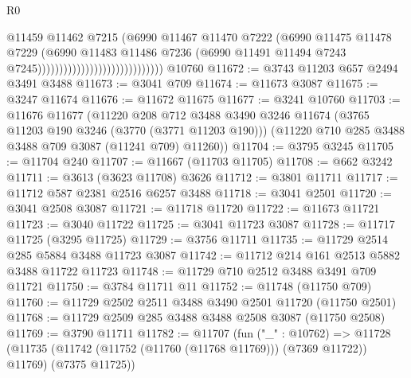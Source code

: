 \begin{lexlean}{R0}
\begin{coremodule}
                                                      @11459
                                                      @11462
                                                      @7215
                                                      (@6990
                                                        @11467
                                                        @11470
                                                        @7222
                                                        (@6990
                                                          @11475
                                                          @11478
                                                          @7229
                                                          (@6990
                                                            @11483
                                                            @11486
                                                            @7236
                                                            (@6990
                                                              @11491
                                                              @11494
                                                              @7243
                                                              @7245)))))))))))))))))))))))))))))
    @10760
@11672 := @3743 @11203 @657 @2494 @3491 @3488
@11673 := @3041 @709
@11674 := @11673 @3087
@11675 := @3247 @11674
@11676 := @11672 @11675
@11677 := @3241 @10760
@11703 := @11676
    @11677
    (@11220
      @208
      @712
      @3488
      @3490
      @3246
      @11674
      (@3765 @11203 @190 @3246 (@3770 (@3771 @11203 @190)))
      (@11220 @710 @285 @3488 @3488 @709 @3087 (@11241 @709) @11260))
@11704 := @3795 @3245
@11705 := @11704 @240
@11707 := @11667 (@11703 @11705)
@11708 := @662 @3242
@11711 := @3613 (@3623 @11708) @3626
@11712 := @3801 @11711
@11717 := @11712 @587 @2381 @2516 @6257 @3488
@11718 := @3041 @2501
@11720 := @3041 @2508 @3087
@11721 := @11718 @11720
@11722 := @11673 @11721
@11723 := @3040 @11722
@11725 := @3041 @11723 @3087
@11728 := @11717 @11725 (@3295 @11725)
@11729 := @3756 @11711
@11735 := @11729 @2514 @285 @5884 @3488 @11723 @3087
@11742 := @11712 @214 @161 @2513 @5882 @3488 @11722 @11723
@11748 := @11729 @710 @2512 @3488 @3491 @709 @11721
@11750 := @3784 @11711 @11
@11752 := @11748 (@11750 @709)
@11760 := @11729 @2502 @2511 @3488 @3490 @2501 @11720 (@11750 @2501)
@11768 := @11729 @2509 @285 @3488 @3488 @2508 @3087 (@11750 @2508)
@11769 := @3790 @11711
@11782 := @11707
    (fun ("_" : @10762) =>
    @11728 (@11735 (@11742 (@11752 (@11760 (@11768 @11769))) (@7369 @11722)) @11769) (@7375 @11725))

\end{coremodule}
\end{lexlean}
